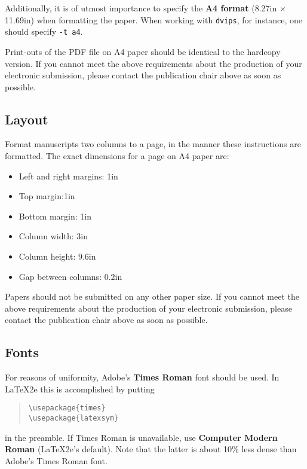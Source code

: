 \documentclass[11pt]{article}
\begin{document}
Additionally, it is of utmost importance to specify the {\bf A4 format} (8.27in $\times$ 11.69in) when formatting the paper. When working with {\tt dvips}, for instance, one should specify {\tt -t a4}.

Print-outs of the PDF file on A4 paper should be identical to the
hardcopy version.  If you cannot meet the above requirements about the
production of your electronic submission, please contact the
publication chair above as soon as possible.


\subsection{Layout}
\label{ssec:layout}

Format manuscripts two columns to a page, in the manner these
instructions are formatted. The exact dimensions for a page on A4
paper are:
\begin{itemize}
\item Left and right margins: 1in
\item Top margin:1in
\item Bottom margin: 1in
\item Column width: 3in
\item Column height: 9.6in
\item Gap between columns: 0.2in
\end{itemize}

\noindent Papers should not be submitted on any other paper size. If you cannot meet the above requirements about the production of your electronic submission, please contact the publication chair above as soon as possible.

\subsection{Fonts}

For reasons of uniformity, Adobe's {\bf Times Roman} font should be
used. In \LaTeX2e{} this is accomplished by putting

\begin{quote}
\begin{verbatim}
\usepackage{times}
\usepackage{latexsym}
\end{verbatim}
\end{quote}
in the preamble. If Times Roman is unavailable, use {\bf Computer
  Modern Roman} (\LaTeX2e{}'s default).  Note that the latter is about
  10\% less dense than Adobe's Times Roman font.
\end{document}
